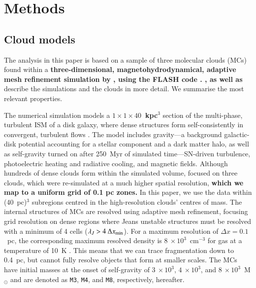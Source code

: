 \section{Methods}\label{methods}


\subsection{Cloud models}\label{methods:clouds}


The analysis in this paper is based on a sample of three molecular clouds (MCs) found within a \textbf{three-dimensional, magnetohydrodynamical, adaptive mesh refinement simulation by , using the FLASH code \citep{Fryxell2000}.
, as well as \citet[ hereafter]{Chira2018}} describe the simulations and the clouds in more detail. 
We summarise the most relevant properties. 

The numerical simulation models a \textbf{$1\times1\times40$~kpc$^3$} section of the multi-phase, turbulent ISM of a disk galaxy, where dense structures form self-consistently in convergent, turbulent flows .  
The model includes gravity---a background galactic-disk potential accounting for a stellar component and a dark matter halo, as well as self-gravity turned on after 250~Myr of simulated time---SN-driven turbulence, photoelectric heating and radiative cooling, and magnetic fields. 
Although hundreds of dense clouds form within the simulated volume,  focused on three clouds, which were re-simulated at a much higher spatial resolution, \textbf{which we map to a uniform grid of 0.1 pc zones.}
In this paper, we use the data within (40~pc)$^{3}$ subregions centred in the high-resolution clouds' centres of mass.
The internal structures of MCs are resolved using adaptive mesh refinement, focusing grid resolution on dense regions where Jeans unstable structures must be resolved with a minimum of 4 cells ($\lambda_J > 4~\Delta x_{\rm min}$).
For a maximum resolution of $\Delta x = 0.1$~pc, the corresponding maximum resolved density is $8~\times 10^3$~cm$^{-3}$ for gas at a temperature of 10~K .
This means that we can trace fragmentation down to 0.4~pc, but cannot fully resolve objects that form at smaller scales.
The MCs have initial masses at the onset of self-gravity of $3~\times 10^3$, $4~\times 10^3$, and $8~\times 10^3$~M$_{\odot}$ and are denoted as \texttt{M3}, \texttt{M4}, and \texttt{M8}, respectively, hereafter.

